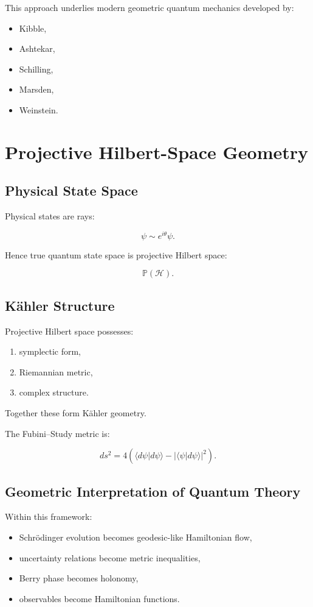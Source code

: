 \documentclass[11pt]{article}
\begin{document}
This approach underlies modern geometric quantum mechanics developed by:

\begin{itemize}
\item Kibble,
\item Ashtekar,
\item Schilling,
\item Marsden,
\item Weinstein.
\end{itemize}

\section{Projective Hilbert-Space Geometry}

\subsection{Physical State Space}

Physical states are rays:

\[
\psi \sim e^{i\theta}\psi.
\]

Hence true quantum state space is projective Hilbert space:

\[
\mathbb P(\mathcal H).
\]

\subsection{K\"ahler Structure}

Projective Hilbert space possesses:

\begin{enumerate}
\item symplectic form,
\item Riemannian metric,
\item complex structure.
\end{enumerate}

Together these form K\"ahler geometry.

The Fubini--Study metric is:

\[
ds^2
=
4
\left(
\langle d\psi|d\psi\rangle
-
|\langle \psi|d\psi\rangle|^2
\right).
\]

\subsection{Geometric Interpretation of Quantum Theory}

Within this framework:

\begin{itemize}
\item Schr\"odinger evolution becomes geodesic-like Hamiltonian flow,
\item uncertainty relations become metric inequalities,
\item Berry phase becomes holonomy,
\item observables become Hamiltonian functions.
\end{itemize}
\end{document}
